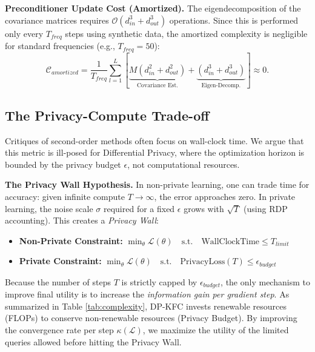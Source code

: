 \documentclass{article}
\theoremstyle{plain}
\theoremstyle{definition}
\theoremstyle{remark}
\begin{document}
\textbf{Preconditioner Update Cost (Amortized).}
The eigendecomposition of the covariance matrices requires $\mathcal{O}(d_{in}^3 + d_{out}^3)$ operations. Since this is performed only every $T_{freq}$ steps using synthetic data, the amortized complexity is negligible for standard frequencies (e.g., $T_{freq}=50$):
\begin{equation}
    \mathcal{C}_{amortized} = \frac{1}{T_{freq}} \sum_{l=1}^L \left[ \underbrace{M(d_{in}^2 + d_{out}^2)}_{\text{Covariance Est.}} + \underbrace{(d_{in}^3 + d_{out}^3)}_{\text{Eigen-Decomp.}} \right] \approx 0.
\end{equation}

\subsection{The Privacy-Compute Trade-off}
\label{subsec:privacy_wall}

Critiques of second-order methods often focus on wall-clock time. We argue that this metric is ill-posed for Differential Privacy, where the optimization horizon is bounded by the privacy budget $\epsilon$, not computational resources.

\textbf{The Privacy Wall Hypothesis.}
In non-private learning, one can trade time for accuracy: given infinite compute $T \to \infty$, the error approaches zero. In private learning, the noise scale $\sigma$ required for a fixed $\epsilon$ grows with $\sqrt{T}$ (using RDP accounting). This creates a \textit{Privacy Wall}:
\begin{itemize}
    \item \textbf{Non-Private Constraint:} $\min_{\theta} \mathcal{L}(\theta) \quad \text{s.t.} \quad \text{WallClockTime} \le T_{limit}$
    \item \textbf{Private Constraint:} $\min_{\theta} \mathcal{L}(\theta) \quad \text{s.t.} \quad \text{PrivacyLoss}(T) \le \epsilon_{budget}$
\end{itemize}
Because the number of steps $T$ is strictly capped by $\epsilon_{budget}$, the only mechanism to improve final utility is to increase the \textit{information gain per gradient step}.
As summarized in Table \ref{tab:complexity}, DP-KFC invests renewable resources (FLOPs) to conserve non-renewable resources (Privacy Budget). By improving the convergence rate per step $\kappa(\mathcal{L})$, we maximize the utility of the limited queries allowed before hitting the Privacy Wall.
\end{document}
